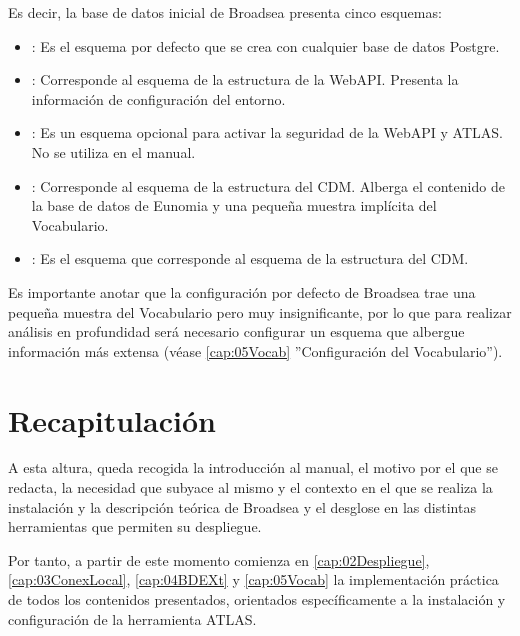 Es decir, la base de datos inicial de Broadsea presenta cinco esquemas:

\begin{itemize}
    \item \textbf{}: Es el esquema por defecto que se crea con cualquier base de datos Postgre.
    \item \textbf{}: Corresponde al esquema  de la estructura de la WebAPI. Presenta la información de configuración del entorno.
    \item \textbf{}: Es un esquema opcional para activar la seguridad de la WebAPI y ATLAS. No se utiliza en el manual.
    \item \textbf{}: Corresponde al esquema  de la estructura del CDM. Alberga el contenido de la base de datos de Eunomia y una pequeña muestra implícita del Vocabulario.
    \item \textbf{}:  Es el esquema que corresponde al esquema  de la estructura del CDM.
\end{itemize}

Es importante anotar que la configuración por defecto de Broadsea trae una pequeña muestra del Vocabulario pero muy insignificante, por lo que para realizar análisis en profundidad será necesario configurar un esquema que albergue información más extensa (véase \ref{cap:05Vocab} ''Configuración del Vocabulario'').

\section{Recapitulación} \label{sec:01recap}

A esta altura, queda recogida la introducción al manual, el motivo por el que se redacta, la necesidad que subyace al mismo y el contexto en el que se realiza la instalación y la descripción teórica de Broadsea y el desglose en las distintas herramientas que permiten su despliegue.

Por tanto, a partir de este momento comienza en \ref{cap:02Despliegue}, \ref{cap:03ConexLocal}, \ref{cap:04BDEXt} y \ref{cap:05Vocab} la implementación práctica de todos los contenidos presentados, orientados específicamente a la instalación y configuración de la herramienta ATLAS. 



